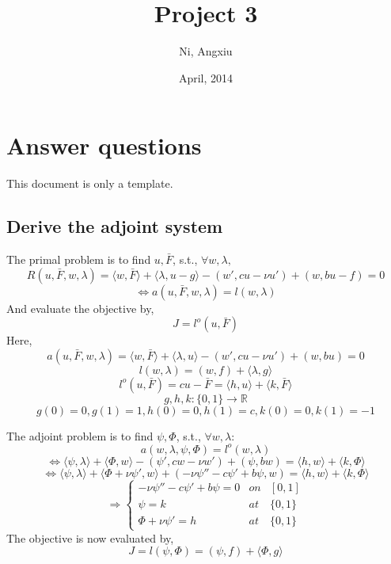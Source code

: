 \documentclass{article}
\title{Project 3}
\author{Ni, Angxiu}
\date{April, 2014}
\begin{document}
\maketitle

\section{Answer questions}
\label{sec: Q1}
This document is only a template.
\subsection{Derive the adjoint system}
The primal problem is to find $u, \bar{F}$, s.t., $\forall w, \lambda,$
    \[ R(u, \bar{F}, w, \lambda) = \langle w, \bar{F}\rangle  +\langle \lambda, u-g\rangle  - (w', cu-\nu u') + (w, bu-f) = 0 \]
    \[ \Leftrightarrow a (u, \bar{F}, w, \lambda) = l(w,\lambda) \]
And evaluate the objective by,
    \[ J = l^o (u ,\bar{F}) \]
Here,
    \[ a(u, \bar{F}, w, \lambda) = \langle w, \bar{F}\rangle  +\langle \lambda, u\rangle  - (w', cu-\nu u') + (w, bu) = 0 \]
    \[ l(w,\lambda) = (w,f) + \langle \lambda, g\rangle  \]
    \[ l^o(u, \bar{F}) = cu-\bar{F} = \langle h,u\rangle  +\langle k, \bar{F}\rangle   \]
    \[ g, h, k: \{0, 1\} \rightarrow \mathbb{R} \]
    \[ g(0) = 0, g(1) = 1, h(0)=0, h(1) =c, k(0) = 0, k(1) = -1 \]

The adjoint problem is to find $\psi, \Phi$, s.t., $\forall w, \lambda:$
    \[ a (w, \lambda, \psi, \Phi) = l^o (w,\lambda) \]
    \[ \Leftrightarrow \langle \psi, \lambda\rangle  + \langle \Phi, w\rangle  - (\psi', cw-\nu w') + (\psi, bw) = \langle h,w\rangle  +\langle k, \Phi\rangle \]
    \[ \Leftrightarrow \langle \psi, \lambda\rangle  + \langle \Phi+ \nu \psi', w\rangle  + (-\nu \psi'' - c\psi'+b\psi, w) = \langle h,w\rangle  +\langle k, \Phi\rangle \]
    \[ 
    \Rightarrow \left\{ \begin{array}{rcl}
    -\nu \psi'' - c\psi'+b\psi =0  & on & [0,1] \\
    \psi=k& at &\{0,1\} \\
    \Phi + \nu \psi'=h& at &\{0,1\} 
    \end{array}\right. 
    \]
The objective is now evaluated by,
    \[ J = l (\psi ,\Phi) =  (\psi,f) + \langle \Phi, g\rangle  \]
    
\end{document}
